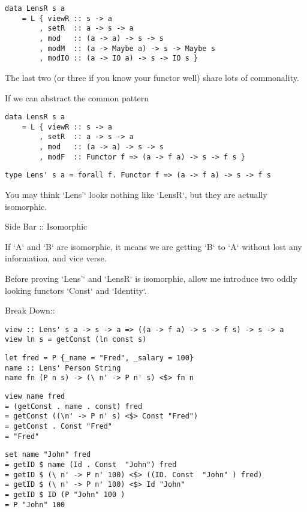 \begin{verbatim}
data LensR s a
    = L { viewR :: s -> a
        , setR  :: a -> s -> a
        , mod   :: (a -> a) -> s -> s
        , modM  :: (a -> Maybe a) -> s -> Maybe s
        , modIO :: (a -> IO a) -> s -> IO s }
\end{verbatim}

The last two (or three if you know your functor well) share lots of commonality.

If we can abstract the common pattern

\begin{verbatim}
data LensR s a
    = L { viewR :: s -> a
        , setR  :: a -> s -> a
        , mod   :: (a -> a) -> s -> s
        , modF  :: Functor f => (a -> f a) -> s -> f s }
\end{verbatim}



\begin{verbatim}
type Lens' s a = forall f. Functor f => (a -> f a) -> s -> f s
\end{verbatim}

You may think `Lens'` looks nothing like `LensR`, but they are actually isomorphic.



Side Bar :: Isomorphic

If `A` and `B` are isomorphic, it means we are getting `B` to `A` without lost any information, and vice verse.

Before proving `Lens'` and `LensR` is isomorphic, allow me introduce two oddly looking functors `Const` and `Identity`.


Break Down::
\begin{verbatim}
view :: Lens' s a -> s -> a => ((a -> f a) -> s -> f s) -> s -> a
view ln s = getConst (ln const s)
\end{verbatim}

\begin{verbatim}
let fred = P {_name = "Fred", _salary = 100}
name :: Lens' Person String
name fn (P n s) -> (\ n' -> P n' s) <$> fn n
\end{verbatim}

\begin{verbatim}
view name fred
= (getConst . name . const) fred
= getConst ((\n' -> P n' s) <$> Const "Fred")
= getConst . Const "Fred"
= "Fred"
\end{verbatim}

\begin{verbatim}
set name "John" fred
= getID $ name (Id . Const  "John") fred
= getID $ (\ n' -> P n' 100) <$> ((ID. Const  "John" ) fred)
= getID $ (\ n' -> P n' 100) <$> Id "John"
= getID $ ID (P "John" 100 )
= P "John" 100
\end{verbatim}


